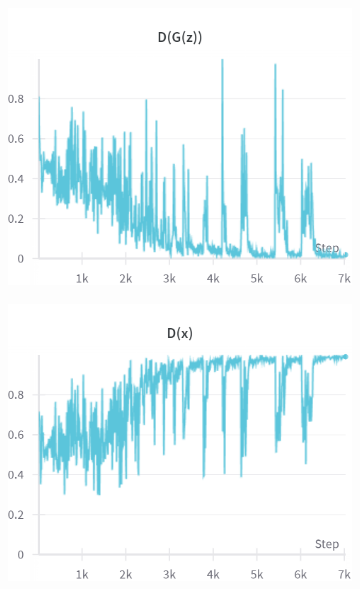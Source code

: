 \begin{figure}[H]
    \begin{subfigure}{0.45\textwidth}
        \centering
        \includegraphics[width=0.95\linewidth]{init/D_G_z.png}
        \caption{}
        \label{subfig:init/D_G_z}
    \end{subfigure}%
    \begin{subfigure}{0.45\textwidth}
        \centering
        \includegraphics[width=0.95\linewidth]{init/D_x.png}
        \caption{}
        \label{subfig:init/D_x}
    \end{subfigure}


\end{figure}

